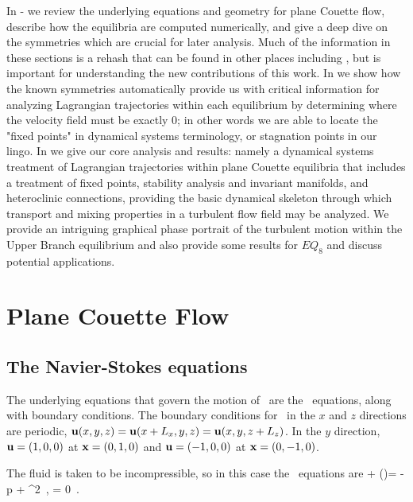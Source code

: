 \documentclass[letter,12pt,openany]{article}
\begin{document}
 In - we review the underlying equations and geometry for plane Couette flow, describe how the equilibria are computed numerically, and give a deep dive on the symmetries which are crucial for later analysis. Much of the information in these sections is a rehash that can be found in other places including \cite{GHCW07}, but is important for understanding the new contributions of this work.  In  we show how the known symmetries automatically provide us with critical information for analyzing Lagrangian trajectories within each equilibrium by determining where the velocity field must be exactly 0; in other words we are able to locate the "fixed points" in dynamical systems terminology, or stagnation points in our lingo. In  we give our core analysis and results: namely a dynamical systems treatment of Lagrangian trajectories within plane Couette equilibria that includes a treatment of fixed points, stability analysis and invariant manifolds, and heteroclinic connections, providing the basic dynamical skeleton through which transport and mixing properties in a turbulent flow field may be analyzed. We provide an intriguing graphical phase portrait of the turbulent motion within the Upper Branch equilibrium and also provide some results for $EQ_8$ and discuss potential applications.





\section{\centering Plane Couette Flow}
\label{sec:PCF}

\subsection{The Navier-Stokes equations}
\label{sec:NS}
 The underlying equations
that govern the motion of \pCf\ are the \NS\ equations,
along with boundary conditions. The boundary conditions for \pCf\ in the $x$
and $z$ directions are periodic,
 $ {\bf u}(x, y, z) = {\bf u}(x+L_x, y, z) =
{\bf u}(x, y, z + L_z) $.
 In the $y$ direction,
 ${\bf u} = (1,0,0)$ at ${\bf x} = (0,1,0)$ and ${\bf u} = (-1,0,0)$ at ${\bf x} =
 (0,-1,0)$.

 The fluid is taken to be incompressible, so in this case the
 \NS\ equations are
 \beq
  + (\bu \cdot \nabla)\bu = -\nabla p +  \nabla^{2} \bu
    \,,\qquad
\nabla \cdot \bu  = 0 \,. \label{eqn:NavierStokes} \eeq 
\end{document}
